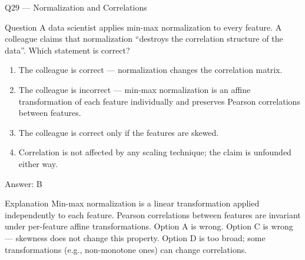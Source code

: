 \documentclass[aspectratio=169,8pt]{beamer}
\begin{document}
	\begin{frame}{Q29 --- Normalization and Correlations}
		\begin{block}{Question}
			A data scientist applies min-max normalization to every feature. A colleague claims that normalization ``destroys the correlation structure of the data''. Which statement is correct?
		\end{block}
		\begin{enumerate}
			\item The colleague is correct --- normalization changes the correlation matrix.
			\item The colleague is incorrect --- min-max normalization is an affine transformation of each feature individually and preserves Pearson correlations between features.
			\item The colleague is correct only if the features are skewed.
			\item Correlation is not affected by any scaling technique; the claim is unfounded either way.
		\end{enumerate}
		\begin{exampleblock}{Answer: B}\end{exampleblock}
		\begin{block}{Explanation}
			Min-max normalization is a linear transformation applied independently to each feature. Pearson correlations between features are invariant under per-feature affine transformations. Option A is wrong. Option C is wrong --- skewness does not change this property. Option D is too broad; some transformations (e.g., non-monotone ones) can change correlations.
		\end{block}
	\end{frame}
	
\end{document}
